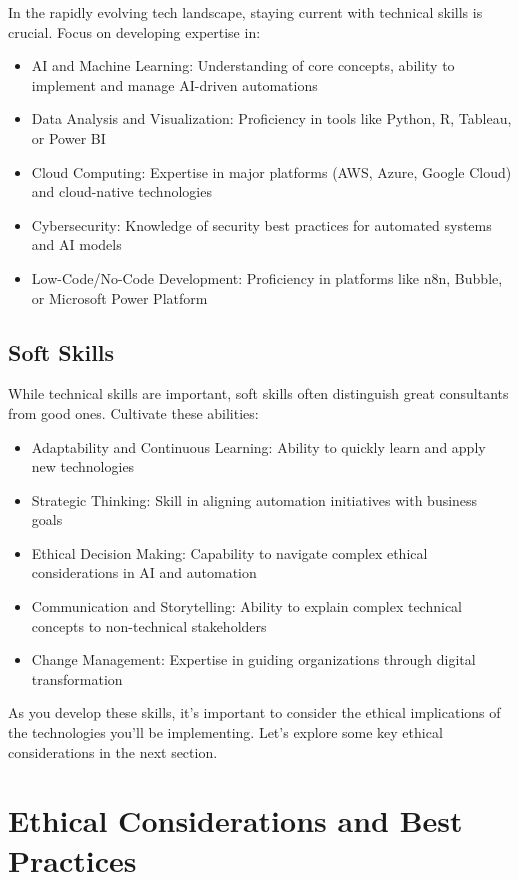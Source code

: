 In the rapidly evolving tech landscape, staying current with technical skills is crucial. Focus on developing expertise in:

\begin{itemize}
    \item AI and Machine Learning: Understanding of core concepts, ability to implement and manage AI-driven automations
    \item Data Analysis and Visualization: Proficiency in tools like Python, R, Tableau, or Power BI
    \item Cloud Computing: Expertise in major platforms (AWS, Azure, Google Cloud) and cloud-native technologies
    \item Cybersecurity: Knowledge of security best practices for automated systems and AI models
    \item Low-Code/No-Code Development: Proficiency in platforms like n8n, Bubble, or Microsoft Power Platform
\end{itemize}

\subsection{Soft Skills}

While technical skills are important, soft skills often distinguish great consultants from good ones. Cultivate these abilities:

\begin{itemize}
    \item Adaptability and Continuous Learning: Ability to quickly learn and apply new technologies
    \item Strategic Thinking: Skill in aligning automation initiatives with business goals
    \item Ethical Decision Making: Capability to navigate complex ethical considerations in AI and automation
    \item Communication and Storytelling: Ability to explain complex technical concepts to non-technical stakeholders
    \item Change Management: Expertise in guiding organizations through digital transformation
\end{itemize}

As you develop these skills, it's important to consider the ethical implications of the technologies you'll be implementing. Let's explore some key ethical considerations in the next section.

\section{Ethical Considerations and Best Practices}

